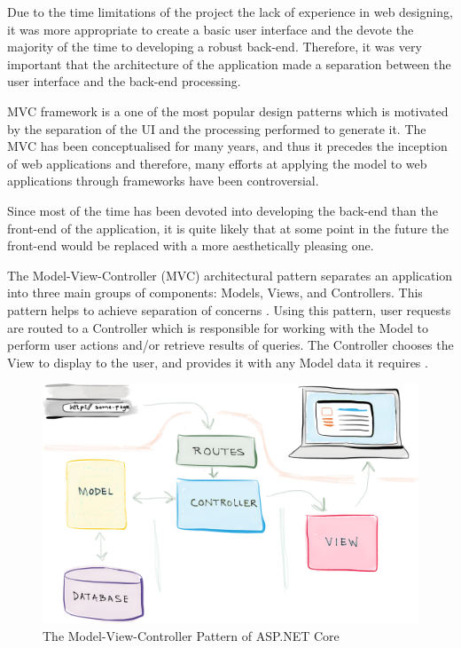 Due to the time limitations of the project the lack of experience in web designing, it was more appropriate to create a basic user interface and the devote the majority of the time to developing a robust back-end. Therefore, it was very important that the architecture of the application made a separation between the user interface and the back-end processing.

MVC framework is a one of the most popular design patterns which is motivated by the separation of the  UI and the processing performed to generate it. The MVC has been conceptualised for many years, and thus it precedes the inception of web applications and therefore, many efforts at applying the model to web applications through frameworks have been controversial.

Since most of the time has been devoted into developing the back-end than the front-end of the application, it is quite likely that at some point in the future the front-end would be replaced with a more aesthetically pleasing one.


The Model-View-Controller (MVC) architectural pattern separates an application into three main groups of components: Models, Views, and Controllers. This pattern helps to achieve separation of concerns \cite{separationOfConcerns}. Using this pattern, user requests are routed to a Controller which is responsible for working with the Model to perform user actions and/or retrieve results of queries. The Controller chooses the View to display to the user, and provides it with any Model data it requires \cite{mvc}. 

\begin{figure}[h]
\begin{center}
\includegraphics[width=17cm]{imgs/mvc.png}
\end{center}\vspace{-0.3cm}
\caption[The Model-View-Controller Pattern of ASP.NET Core]{The Model-View-Controller Pattern of ASP.NET Core} \label{mvc}
\end{figure}


